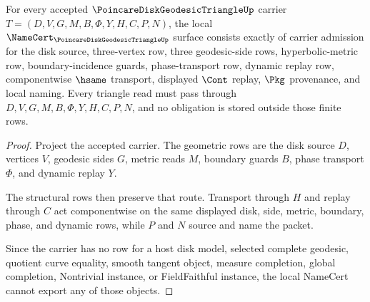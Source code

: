 \begin{theorem}
\label{thm:poincare-disk-geodesic-triangle-namecert-obligations}
For every accepted $\PoincareDiskGeodesicTriangleUp$ carrier $T=(D,V,G,M,B,\Phi,Y,H,C,P,N)$, the local $\NameCert_{\PoincareDiskGeodesicTriangleUp}$ surface consists exactly of carrier admission for the disk source, three-vertex row, three geodesic-side rows, hyperbolic-metric row, boundary-incidence guards, phase-transport row, dynamic replay row, componentwise $\hsame$ transport, displayed $\Cont$ replay, $\Pkg$ provenance, and local naming. Every triangle read must pass through $D,V,G,M,B,\Phi,Y,H,C,P,N$, and no obligation is stored outside those finite rows.
\end{theorem}
\begin{proof}
Project the accepted carrier. The geometric rows are the disk source $D$, vertices $V$, geodesic sides $G$, metric reads $M$, boundary guards $B$, phase transport $\Phi$, and dynamic replay $Y$.

The structural rows then preserve that route. Transport through $H$ and replay through $C$ act componentwise on the same displayed disk, side, metric, boundary, phase, and dynamic rows, while $P$ and $N$ source and name the packet.

Since the carrier has no row for a host disk model, selected complete geodesic, quotient curve equality, smooth tangent object, measure completion, global completion, Nontrivial instance, or FieldFaithful instance, the local NameCert cannot export any of those objects.
\end{proof}

